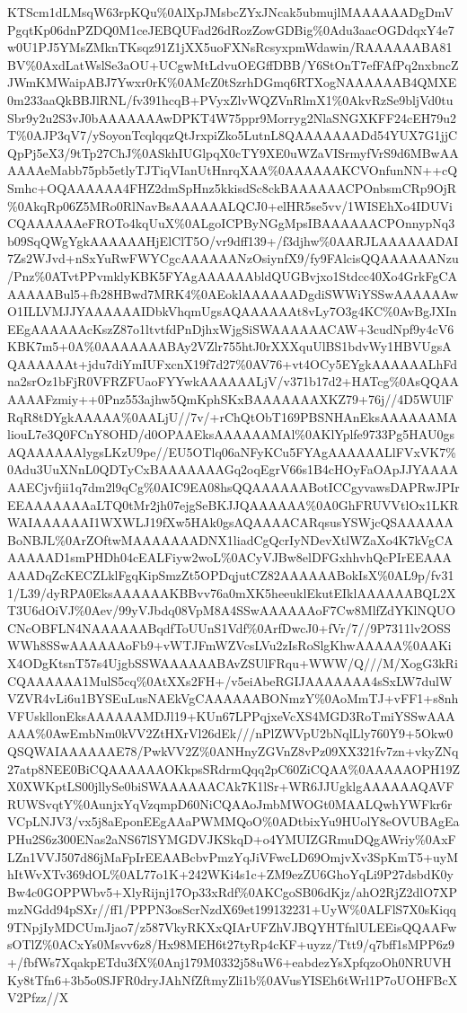 \documentclass[]{article}
\begin{document}
KTScm1dLMsqW63rpKQu\%0AlXpJMsbcZYxJNcak5ubmujlMAAAAAADgDmVPgqtKp06dnPZDQ0M1ceJEBQUFad26dRozZowGDBig\%0Adu3aacOGDdqxY4e7w0U1PJ5YMsZMknTKsqz91Z1jXX5uoFXNsRcsyxpmWdawin/RAAAAAABA81BV\%0AxdLatWslSe3aOU+UCgwMtLdvuOEGffDBB/Y6StOnT7efFAfPq2nxbncZJWmKMWaipABJ7Ywxr0rK\%0AMcZ0tSzrhDGmq6RTXogNAAAAAAB4QMXE0m233aaQkBBJlRNL/fv391hcqB+PVyxZlvWQZVnRlmX1\%0AkvRzSe9bljVd0tuSbr9y2u2S3vJ0bAAAAAAAwDPKT4W75ppr9Morryg2NlaSNGXKFF24cEH79u2T\%0AJP3qV7/ySoyonTcqlqqzQtJrxpiZko5LutnL8QAAAAAAADd54YUX7G1jjCQpPj5eX3/9tTp27ChJ\%0ASkhIUGlpqX0cTY9XE0uWZaVISrmyfVrS9d6MBwAAAAAAeMabb75pb5etlyTJTiqVIanUtHnrqXAA\%0AAAAAAKCVOnfunNN++cQSmhc+OQAAAAAA4FHZ2dmSpHnz5kkisdSc8ckBAAAAAACPOnbsmCRp9OjR\%0AkqRp06Z5MRo0RlNavBsAAAAAALQCJ0+elHR5se5vv/1WISEhXo4IDUViCQAAAAAAeFROTo4kqUuX\%0ALgoICPByNGgMpsIBAAAAAACPOnnypNq3b09SqQWgYgkAAAAAAHjElClT5O/vr9dff139+/f3djhw\%0AARJLAAAAAADAI7Zs2WJvd+nSxYuRwFWYCgcAAAAAANzOsiynfX9/fy9FAlcisQQAAAAAANzu/Pnz\%0ATvtPPvmklyKBK5FYAgAAAAAAbldQUGBvjxo1Stdcc40Xo4GrkFgCAAAAAABul5+fb28HBwd7MRK4\%0AEoklAAAAAADgdiSWWiYSSwAAAAAAwO1ILLVMJJYAAAAAAIDbkVhqmUgsAQAAAAAAt8vLy7O3g4KC\%0AvBgJXInEEgAAAAAAcKszZ87o1ltvtfdPnDjhxWjgSiSWAAAAAACAW+3cudNpf9y4cV6KBK7m5+0A\%0AAAAAAABAy2VZlr755htJ0rXXXquUlBS1bdvWy1HBVUgsAQAAAAAAt+jdu7diYmIUFxcnX19f7d27\%0AV76+vt4OCy5EYgkAAAAAALhFdna2srOz1bFjR0VFRZFUaoFYYwkAAAAAALjV/v371b17d2+HATcg\%0AsQQAAAAAAFzmiy++0Pnz553ajhw5QmKphSKxBAAAAAAAXKZ79+76j//4D5WUlFRqR8tDYgkAAAAA\%0AALjU//7v/+rChQtObT169PBSNHAnEksAAAAAAMAliouL7e3Q0FCnY8OHD/d0OPAAEksAAAAAAMAl\%0AKlYplfe9733Pg5HAU0gsAQAAAAAAlygsLKzU9pe//EU5OTlq06aNFyKCu5FYAgAAAAAALlFVxVK7\%0Adu3UuXNnL0QDTyCxBAAAAAAAGq2oqEgrV66s1B4cHOyFaOApJJYAAAAAAECjvfjii1q7dm2l9qCg\%0AIC9EA08hsQQAAAAAABotICCgyvawsDAPRwJPIrEEAAAAAAAaLTQ0tMr2jh07ejgSeBKJJQAAAAAA\%0A0GhFRUVVtlOx1LKRWAIAAAAAAI1WXWLJ19fXw5HAk0gsAQAAAACARqsusYSWjcQSAAAAAABoNBJL\%0ArZOftwMAAAAAAADNX1liadCgQcrIyNDevXtlWZaXo4K7kVgCAAAAAAD1smPHDh04cEALFiyw2woL\%0ACyVJBw8elDFGxhhvhQcPIrEEAAAAAADqZcKECZLklFgqKipSmzZt5OPDqjutCZ82AAAAAABokIsX\%0AL9p/fv311/L39/dyRPA0EksAAAAAAKBBvv76a0mXK5heeuklEkutEIklAAAAAABQL2XT3U6dOiVJ\%0Aev/99yVJbdq08VpM8A4SSwAAAAAAoF7Cw8MlfZdYKlNQUOCNcOBFLN4NAAAAAABqdfToUUnS1Vdf\%0ArfDwcJ0+fVr/7//9P7311lv2OSSWWh8SSwAAAAAAoFb9+vWTJFmWZVcsLVu2zIsRoSlgKhwAAAAA\%0AAKiX4ODgKtsnT57s4UjgbSSWAAAAAABAvZSUlFRqu+WWW/Q///M/XogG3kRiCQAAAAAA1MulS5cq\%0AtXXs2FH+/v5eiAbeRGIJAAAAAAA4sSxLW7dulWVZVR4vLi6u1BYSEuLusNAEkVgCAAAAAABONmzY\%0AoMmTJ+vFF1+s8nhVFUskllonEksAAAAAAMDJl19+KUn67LPPqjxeVcXS4MGD3RoTmiYSSwAAAAAA\%0AwEmbNm0kVV2ZtHXrVl26dEk///nPlZWVpU2bNqlLly760Y9+5Okw0QSQWAIAAAAAAE78/PwkVV2Z\%0ANHnyZGVnZ8vPz09XX321fv7zn+vkyZNq27atp8NEE0BiCQAAAAAAOKkpsSRdrmQqq2pC60ZiCQAA\%0AAAAAOPH19ZX0XWKptLS00jllySe0biSWAAAAAACAk7K1lSr+WR6JJUgklgAAAAAAQAVFRUWSvqtY\%0AunjxYqVzqmpD60NiCQAAoJmbMWOGt0MAALQwhYWFkr6rVCpLNJV3/vx5j8aEponEEgAAaPWMMQoO\%0ADtbixYu9HUolY8eOVUBAgEaPHu2S6z300ENas2aNS67lSYMGDVJKSkqD+o4YMUIZGRmuDQgAWriy\%0AxFLZn1VVJ507d86jMaFpIrEEAABcbvPmzYqJiVFwcLD69OmjvXv3SpKmT5+uyMhItWvXTv369dOL\%0AL77o1K+242WKi4s1c+ZM9ezZU6GhoYqLi9P27dsbdK0yBw4c0GOPPWbv5+XlyRijnj17Op33xRdf\%0AKCgoSB06dKjz/ahO2RjZ2dlO7XPmzNGdd94pSXr//ff1/PPPN3osScrNzdX69et199132231+UyW\%0ALFlS7X0sKiqq9TNpjIyMDCUmJjao7/z587VkyRKXxQIArUFZhVJBQYHTfnlULEEisQQAAFwsOTlZ\%0ACxYs0Msvv6z8/Hx98MEH6t27tyRp4cKF+uyzz/Ttt9/q7bff1sMPP6z9+/fbfWs7XqakpETdu3fX\%0Anj179M0332j58uW6+eabdezYsXpfqzoOh0NRUVHKy8tTfn6+3b5o0SJFR0dryJAhNfZftmyZli1b\%0AVusYISEh6tWrl1P7oUOHFBcXV2Pfzz//X
\end{document}
